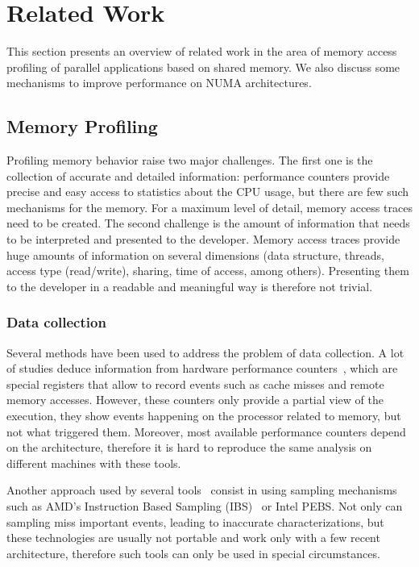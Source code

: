 
\section{Related Work}
\label{sec:soa}

This section presents an overview of related work in the area of memory access profiling of parallel applications based on shared memory.
We also discuss some mechanisms to improve performance on NUMA architectures.

\subsection{Memory Profiling}
\label{sec:soa-profiling}

Profiling memory behavior raise two major challenges.
The first one is the collection of accurate and detailed information: performance counters provide precise and easy access to statistics about the CPU usage, but there are few such mechanisms for the memory.
For a maximum level of detail, memory access traces need to be created.
The second challenge is the amount of information that needs to be interpreted and presented to the developer.
Memory access traces provide huge amounts of information on several dimensions (data structure, threads, access type (read/write), sharing, time of access, among others).
Presenting them to the developer in a readable and meaningful way is therefore not trivial.

\subsubsection{Data collection}

Several methods have been used to address the problem of data collection. A
lot of studies deduce information from hardware performance
counters~\cite{Majo13(Mis)understanding,
Jiang14Understanding,Bosch00Rivet,Weyers14Visualization,Tao01Visualizing,DeRose01Hardware},
which are special registers that allow to record events such as cache misses and remote
memory accesses. However, these counters only provide a partial
view of the execution, they show events happening on the processor related to
memory, but not what triggered them. Moreover, most available performance counters
depend on the architecture, therefore it is hard to reproduce the same
analysis on different machines with these tools.


Another approach used by several
tools~\cite{Lachaize12MemProf,McCurdy2010,Liu14Tool,Gimenez14Dissecting}
consist in using sampling mechanisms such as AMD's Instruction Based Sampling
(IBS)~\cite{Drongowski07Instructionbased} or Intel PEBS. Not only can sampling miss important events, leading to
inaccurate characterizations, but these technologies are usually not portable and work
only with a few recent architecture, therefore such tools can only be used in
special circumstances.

